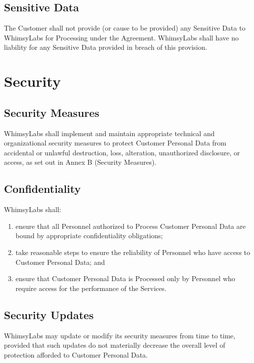 \documentclass[11pt,a4paper]{article}
\begin{document}
\subsection{Sensitive Data}
The Customer shall not provide (or cause to be provided) any Sensitive Data to WhimsyLabs for Processing under the Agreement. WhimsyLabs shall have no liability for any Sensitive Data provided in breach of this provision.

\section{Security}

\subsection{Security Measures}
WhimsyLabs shall implement and maintain appropriate technical and organizational security measures to protect Customer Personal Data from accidental or unlawful destruction, loss, alteration, unauthorized disclosure, or access, as set out in Annex B (Security Measures).

\subsection{Confidentiality}
WhimsyLabs shall:
\begin{enumerate}[label=(\alph*)]
    \item ensure that all Personnel authorized to Process Customer Personal Data are bound by appropriate confidentiality obligations;
    \item take reasonable steps to ensure the reliability of Personnel who have access to Customer Personal Data; and
    \item ensure that Customer Personal Data is Processed only by Personnel who require access for the performance of the Services.
\end{enumerate}

\subsection{Security Updates}
WhimsyLabs may update or modify its security measures from time to time, provided that such updates do not materially decrease the overall level of protection afforded to Customer Personal Data.
\end{document}
